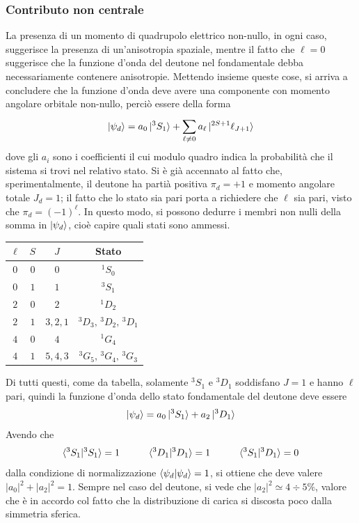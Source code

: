 \documentclass[11pt, a4paper]{scrartcl}
\theoremstyle{style}
\numberwithin{equation}{subsection}
\begin{document}
\subsubsection{Contributo non centrale}

La presenza di un momento di quadrupolo elettrico non-nullo, in ogni caso, suggerisce la presenza di un'anisotropia spaziale, mentre il fatto che $\ell =0$ suggerisce che la funzione d'onda del deutone nel fondamentale debba necessariamente contenere anisotropie. 
Mettendo insieme queste cose, si arriva a concludere che la funzione d'onda deve avere una componente con momento angolare orbitale non-nullo, perci\`o essere della forma
\begin{equation}
	\ket{\psi _d} = a_0 \ket{^3S_1} + \sum_{\ell \neq 0}^{} a_\ell  \ket{^{2S+1}\ell _{J+1}} 
\end{equation}
dove gli $a_i$ sono i coefficienti il cui modulo quadro indica la probabilit\`a che il sistema si trovi nel relativo stato.
Si \`e gi\`a accennato al fatto che, sperimentalmente, il deutone ha parti\`a positiva $\pi_d = +1$ e momento angolare totale $J_d= 1$; il fatto che lo stato sia pari porta a richiedere che $\ell $ sia pari, visto che $\pi_d=(-1)^\ell $.
In questo modo, si possono dedurre i membri non nulli della somma in $\ket{\psi _d} $, cio\`e capire quali stati sono ammessi.
\begin{table}[h!]
	\centering
	\begin{tabular}{c c c | c}
		$\ell $ & $S$ & $J$ & Stato\\
	\hline
		$0$ & $0$ & $0$ & $^{1}S_0$\\
		$0$ & $1$ & $1$ & $^{3}S_1$\\
		$2$ & $0$ & $2$ & $^{1}D_2$\\
		$2$ & $1$ & $3,2,1$ & $^{3}D_3, \, ^{3}D_2,\, ^{3}D_1$\\
		$4$ & $0$ & $4$ & $^{1}G_4$\\
		$4$ & $1$ & $5,4,3$ & $^{3}G_5,\, ^{3}G_4,\, ^{3}G_3$\\
	\hline
	\end{tabular}
\end{table}
Di tutti questi, come da tabella, solamente $^{3}S_1$ e $^{3}D_1$ soddisfano $J=1$ e hanno $\ell $ pari, quindi la funzione d'onda dello stato fondamentale del deutone deve essere
\begin{equation}
	\ket{\psi _d}  = a_0 \ket{^{3}S_1}  + a_2 \ket{^{3}D_1} 
\end{equation}
Avendo che
\[
\braket{^{3}S_1|^{3}S_1} =1 \hspace{1cm} \braket{^{3}D_1|^{3}D_1} = 1 \hspace{1cm} \braket{^{3}S_1|^{3}D_1} =0
\] 
dalla condizione di normalizzazione $\braket{\psi _d|\psi _d} =1$, si ottiene che deve valere $\lvert a_0 \rvert ^2 + \lvert a_2 \rvert ^2 = 1$.
Sempre nel caso del deutone, si vede che $\lvert a_2 \rvert ^2 \simeq 4\div 5 \%$, valore che \`e in accordo col fatto che la distribuzione di carica si discosta poco dalla simmetria sferica.
\end{document}
